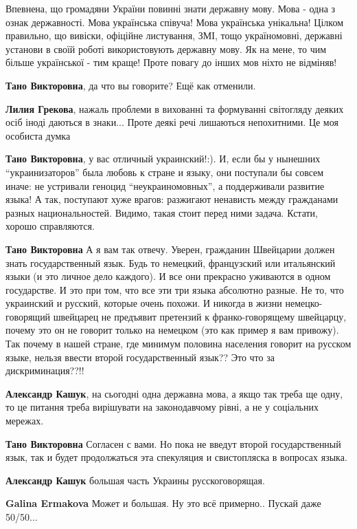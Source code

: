 
Впевнена, що громадяни України повинні знати державну мову. Мова - одна з ознак
державності. Мова українська співуча! Мова українська унікальна! Цілком
правильно, що вивіски, офіційне листування, ЗМІ, тощо україномовні, державні
установи в своїй роботі використовують державну мову. Як на мене, то чим більше
української - тим краще! Проте повагу до інших мов ніхто не відміняв!

\begin{itemize}

\textbf{Тано Викторовна}, да что вы говорите? Ещё как отменили.

\textbf{Лилия Грекова}, нажаль проблеми в вихованні та формуванні світогляду деяких осіб іноді даються в знаки... Проте деякі речі лишаються непохитними. Це моя особиста думка

\textbf{Тано Викторовна}, у вас отличный украинский!:). И, если бы у нынешних
\enquote{украинизаторов} была любовь к стране и языку, они поступали бы совсем иначе:
не устривали геноцид \enquote{неукраиномовных}, а поддерживали развитие языка! А так,
поступают хуже врагов: разжигают ненависть между гражданами разных
национальностей. Видимо, такая стоит перед ними задача. Кстати, хорошо
справляются.

\textbf{Тано Викторовна} А я вам так отвечу. Уверен, гражданин Швейцарии должен
знать государственный язык. Будь то немецкий, французский или итальянский языки
(и это личное дело каждого). И все они прекрасно уживаются в одном государстве.
И это при том, что все эти три языка абсолютно разные. Не то, что украинский и
русский, которые очень похожи. И никогда в жизни немецко-говорящий швейцарец не
предъявит претензий к франко-говорящему швейцарцу, почему это он не говорит
только на немецком (это как пример я вам привожу). Так почему в нашей стране,
где минимум половина населения говорит на русском языке, нельзя ввести второй
государственный язык?? Это что за дискриминация??!!

\textbf{Александр Кашук}, на сьогодні одна державна мова, а якщо так треба ще
одну, то це питання треба вирішувати на законодавчому рівні, а не у соціальних
мережах.

\textbf{Тано Викторовна} Согласен с вами. Но пока не введут второй
государственный язык, так и будет продолжаться эта спекуляция и свистопляска в
вопросах языка.

\textbf{Александр Кашук} большая часть Украины русскоговорящая.

\textbf{Galina Ermakova} Может и большая. Ну это всё примерно.. Пускай даже 50/50...

\end{itemize}


